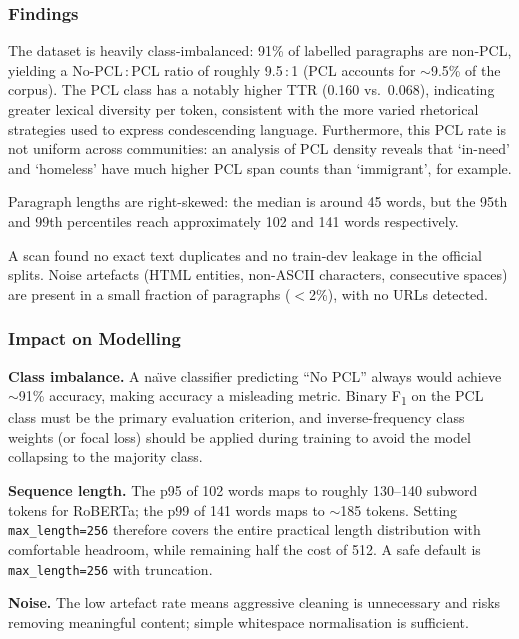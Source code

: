 \documentclass[11pt,a4paper]{article}
\begin{document}
\subsubsection{Findings}

The dataset is heavily class-imbalanced: 91\% of labelled paragraphs are
non-PCL, yielding a No-PCL\,:\,PCL ratio of roughly 9.5\,:\,1 (PCL accounts for
$\sim$9.5\% of the corpus).  The PCL class has a notably higher TTR (0.160
vs.\ 0.068), indicating greater lexical diversity per token, consistent with the
more varied rhetorical strategies used to express condescending language.
Furthermore, this PCL rate is not uniform across communities: an analysis of PCL
density reveals that `in-need' and `homeless' have much higher PCL span counts
than `immigrant', for example.

Paragraph lengths are right-skewed: the median is around 45 words, but the 95th
and 99th percentiles reach approximately 102 and 141 words respectively.

A scan found no exact text duplicates and no train-dev leakage in the official
splits.  Noise artefacts (HTML entities, non-ASCII characters, consecutive
spaces) are present in a small fraction of paragraphs ($<$2\%), with no URLs
detected.

\subsubsection{Impact on Modelling}

\textbf{Class imbalance.}  A na\"\i ve classifier predicting ``No PCL'' always
would achieve $\sim$91\% accuracy, making accuracy a misleading metric. Binary
F\textsubscript{1} on the PCL class must be the primary evaluation criterion,
and inverse-frequency class weights (or focal loss) should be applied during
training to avoid the model collapsing to the majority class.

\noindent\textbf{Sequence length.}  The p95 of 102 words maps to roughly
130--140 subword tokens for RoBERTa; the p99 of 141 words maps to $\sim$185
tokens. Setting \texttt{max\_length=256} therefore covers the entire practical
length distribution with comfortable headroom, while remaining half the cost of
512. A safe default is \texttt{max\_length=256} with truncation.

\noindent\textbf{Noise.}  The low artefact rate means aggressive cleaning is
unnecessary and risks removing meaningful content; simple whitespace
normalisation is sufficient.
\end{document}
